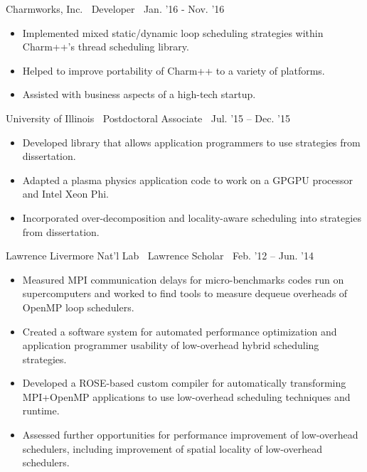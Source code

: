 {\small Charmworks, Inc.$\>$$\>$$\>$$\>$Developer$\>$$\>$$\>$$\>$Jan. '16 - Nov. '16}
\vspace*{-0.0in}
\begin{itemize}
\item Implemented mixed static/dynamic loop scheduling
strategies within Charm++'s thread scheduling library.
\item Helped to improve portability of Charm++ to a variety of platforms. 
\item Assisted with business aspects of a high-tech startup. 
\end{itemize} 

{ University of Illinois$\>$$\>$$\>$$\>$Postdoctoral Associate$\>$$\>$$\>$$\>$Jul. '15 – Dec. '15}
\vspace*{-0.0in}
\begin{itemize} 
\item Developed library that allows application programmers to use strategies from dissertation.
\item Adapted a plasma physics application code to work on a
GPGPU processor and Intel Xeon Phi.
\item Incorporated over-decomposition and locality-aware scheduling into strategies from dissertation.
\end{itemize}

{Lawrence Livermore Nat’l Lab$\>$$\>$$\>$$\>$Lawrence Scholar$\>$$\>$$\>$$\>$Feb. '12 – Jun. '14}
\vspace*{-0.0in}
\begin{itemize} 
\item Measured MPI communication delays for micro-benchmarks codes run on supercomputers and worked to find tools to measure dequeue overheads of OpenMP loop schedulers.
\item Created a software system for automated performance optimization and application programmer usability of low-overhead hybrid scheduling
strategies.
\item Developed a ROSE-based custom compiler for automatically transforming MPI+OpenMP applications to use low-overhead scheduling
techniques and runtime.
\item Assessed further opportunities for performance improvement of low-overhead schedulers, including improvement of spatial locality
of low-overhead schedulers.
\end{itemize}

